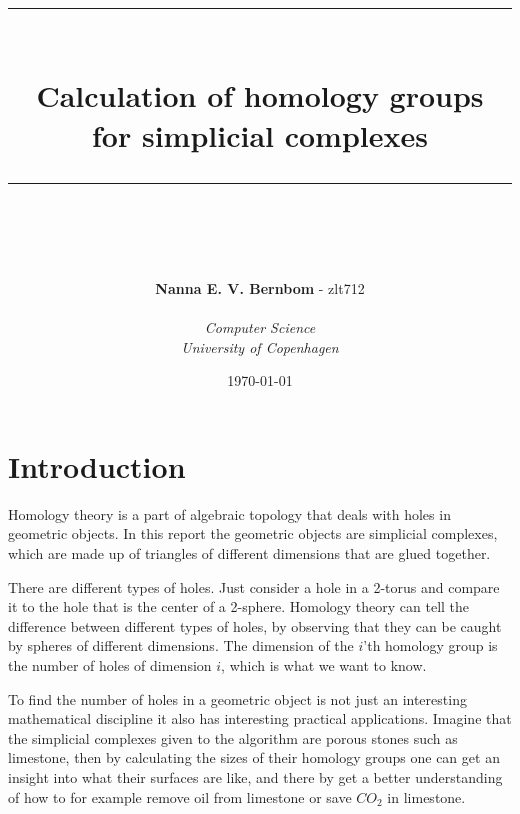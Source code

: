 \documentclass[11pt,a4paper,twoside]{report}
\newcommand{\HRule}{\rule{\linewidth}{0.5mm}}
\begin{document}
\lstset{language=python,frame=single,breaklines=true, title=\lstname}

\begin{titlepage}
\title{\HRule \\[0.4cm]
\textbf{Calculation of homology groups\\for simplicial complexes}\\
\HRule \\[0.4cm]}
\author{\textbf{Nanna E. V. Bernbom} - zlt712\\\\
\textit{Computer Science}\\
\textit{University of Copenhagen}}
\date{\today}

\maketitle
\thispagestyle{empty}
\end{titlepage}

\newpage
\tableofcontents
\newpage
\section*{Introduction}
Homology theory is a part of algebraic topology that deals with holes in geometric objects. In this report the geometric objects are simplicial complexes, which are made up of triangles of different dimensions that are glued together.

There are different types of holes. Just consider a hole in a 2-torus and compare it to the hole that is the center of a 2-sphere. Homology theory can tell the difference between different types of holes, by observing that they can be caught by spheres of different dimensions. The dimension of the $i$'th homology group is the number of holes of dimension $i$, which is what we want to know.

To find the number of holes in a geometric object is not just an interesting mathematical discipline it also has interesting practical applications. Imagine that the simplicial complexes given to the algorithm are porous stones such as limestone, then by calculating the sizes of their homology groups one can get an insight into what their surfaces are like, and there by get a better understanding of how to for example remove oil from limestone or save $CO_2$ in limestone. 
\newpage
\end{document}
